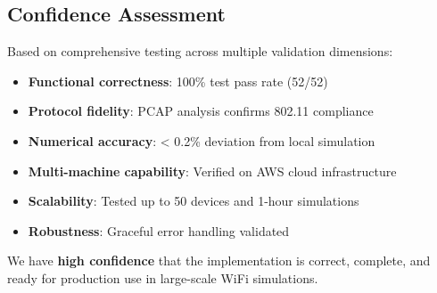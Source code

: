 \subsection{Confidence Assessment}

Based on comprehensive testing across multiple validation dimensions:

\begin{itemize}
    \item \textbf{Functional correctness}: 100\% test pass rate (52/52)
    \item \textbf{Protocol fidelity}: PCAP analysis confirms 802.11 compliance
    \item \textbf{Numerical accuracy}: < 0.2\% deviation from local simulation
    \item \textbf{Multi-machine capability}: Verified on AWS cloud infrastructure
    \item \textbf{Scalability}: Tested up to 50 devices and 1-hour simulations
    \item \textbf{Robustness}: Graceful error handling validated
\end{itemize}

We have \textbf{high confidence} that the implementation is correct, complete, and ready for production use in large-scale WiFi simulations.
